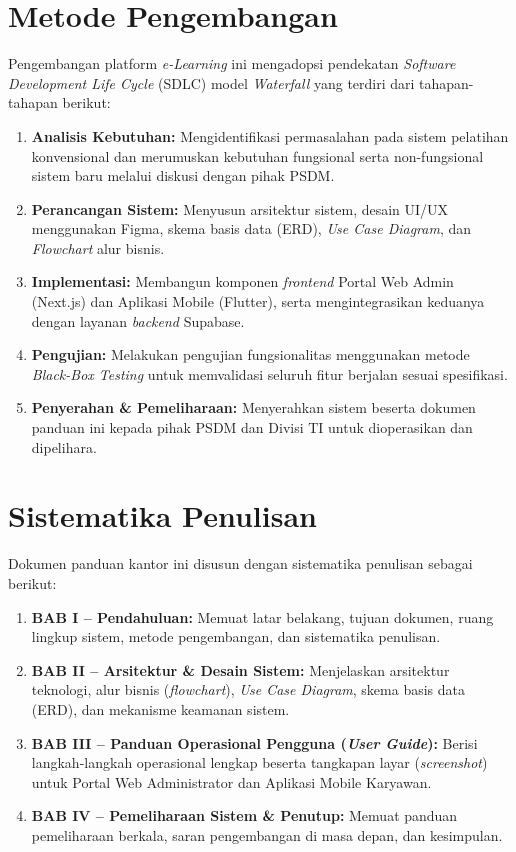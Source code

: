 \section{Metode Pengembangan}
Pengembangan platform \textit{e-Learning} ini mengadopsi pendekatan \textit{Software Development Life Cycle} (SDLC) model \textit{Waterfall} \cite{pressman2022} yang terdiri dari tahapan-tahapan berikut:
\begin{enumerate}
    \item \textbf{Analisis Kebutuhan:} Mengidentifikasi permasalahan pada sistem pelatihan konvensional dan merumuskan kebutuhan fungsional serta non-fungsional sistem baru melalui diskusi dengan pihak PSDM.
    \item \textbf{Perancangan Sistem:} Menyusun arsitektur sistem, desain UI/UX menggunakan Figma, skema basis data (ERD), \textit{Use Case Diagram}, dan \textit{Flowchart} alur bisnis.
    \item \textbf{Implementasi:} Membangun komponen \textit{frontend} Portal Web Admin (Next.js) dan Aplikasi Mobile (Flutter), serta mengintegrasikan keduanya dengan layanan \textit{backend} Supabase.
    \item \textbf{Pengujian:} Melakukan pengujian fungsionalitas menggunakan metode \textit{Black-Box Testing} \cite{blackbox_journal} untuk memvalidasi seluruh fitur berjalan sesuai spesifikasi.
    \item \textbf{Penyerahan \& Pemeliharaan:} Menyerahkan sistem beserta dokumen panduan ini kepada pihak PSDM dan Divisi TI untuk dioperasikan dan dipelihara.
\end{enumerate}

\section{Sistematika Penulisan}
Dokumen panduan kantor ini disusun dengan sistematika penulisan sebagai berikut:
\begin{enumerate}
    \item \textbf{BAB I -- Pendahuluan:} Memuat latar belakang, tujuan dokumen, ruang lingkup sistem, metode pengembangan, dan sistematika penulisan.
    \item \textbf{BAB II -- Arsitektur \& Desain Sistem:} Menjelaskan arsitektur teknologi, alur bisnis (\textit{flowchart}), \textit{Use Case Diagram}, skema basis data (ERD), dan mekanisme keamanan sistem.
    \item \textbf{BAB III -- Panduan Operasional Pengguna (\textit{User Guide}):} Berisi langkah-langkah operasional lengkap beserta tangkapan layar (\textit{screenshot}) untuk Portal Web Administrator dan Aplikasi Mobile Karyawan.
    \item \textbf{BAB IV -- Pemeliharaan Sistem \& Penutup:} Memuat panduan pemeliharaan berkala, saran pengembangan di masa depan, dan kesimpulan.
\end{enumerate}
